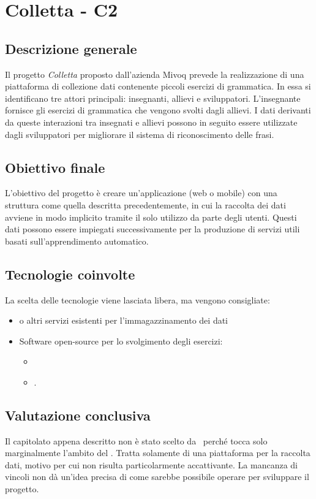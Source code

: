 \section{Colletta - C2} \label{c2}
    \subsection{Descrizione generale}
    Il progetto \textit{Colletta} proposto dall'azienda Mivoq prevede la realizzazione di una piattaforma di collezione dati contenente piccoli esercizi di grammatica.
    In essa si identificano tre attori principali: insegnanti, allievi e sviluppatori. L'insegnante fornisce gli esercizi di grammatica che vengono svolti dagli allievi.
    I dati derivanti da queste interazioni tra insegnati e allievi possono in seguito essere utilizzate dagli sviluppatori per migliorare il sistema di riconoscimento delle frasi.

    \subsection{Obiettivo finale}
    L'obiettivo del progetto è creare un'applicazione (web o mobile) con una struttura come quella descritta precedentemente,
    in cui la raccolta dei dati avviene in modo implicito tramite il solo utilizzo da parte degli utenti. Questi dati possono essere impiegati successivamente per la produzione di
    servizi utili basati sull'apprendimento automatico.

    \subsection{Tecnologie coinvolte}
    La scelta delle tecnologie viene lasciata libera, ma vengono consigliate:
        \begin{itemize}
            \item {} o altri servizi esistenti per l'immagazzinamento dei dati
            \item Software open-source per lo svolgimento degli esercizi:
            \begin{itemize}
                \item {} 
                \item {}.
            \end{itemize}
        \end{itemize}

    \subsection{Valutazione conclusiva}
    Il capitolato appena descritto non è stato scelto da \gruppo\ perché tocca solo marginalmente l'ambito del .
    Tratta solamente di una piattaforma per la raccolta dati, motivo per cui non risulta particolarmente accattivante.
    La mancanza di vincoli non dà un'idea precisa di come sarebbe possibile operare per sviluppare il progetto.

